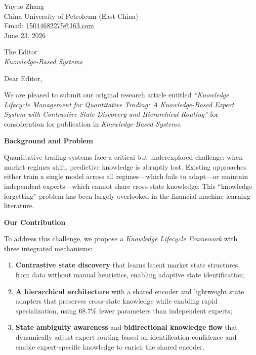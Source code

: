 \documentclass[11pt]{article}
\begin{document}
\begin{flushright}
Yuyue Zhang\\
China University of Petroleum (East China)\\
Email: \href{mailto:15044682275@163.com}{15044682275@163.com}\\
June 23, 2026
\end{flushright}

\begin{flushleft}
The Editor\\
\textit{Knowledge-Based Systems}
\end{flushleft}

\vspace{1em}

Dear Editor,

\vspace{1em}

We are pleased to submit our original research article entitled \textit{“Knowledge Lifecycle Management for Quantitative Trading: A Knowledge-Based Expert System with Contrastive State Discovery and Hierarchical Routing”} for consideration for publication in \textit{Knowledge-Based Systems}.

\vspace{1em}

\textbf{Background and Problem}

Quantitative trading systems face a critical but underexplored challenge: when market regimes shift, predictive knowledge is abruptly lost. Existing approaches either train a single model across all regimes—which fails to adapt—or maintain independent experts—which cannot share cross-state knowledge. This “knowledge forgetting” problem has been largely overlooked in the financial machine learning literature.

\vspace{1em}

\textbf{Our Contribution}

To address this challenge, we propose a \textit{Knowledge Lifecycle Framework} with three integrated mechanisms:

\begin{enumerate}[leftmargin=*,nosep]
\item \textbf{Contrastive state discovery} that learns latent market state structures from data without manual heuristics, enabling adaptive state identification;
\item \textbf{A hierarchical architecture} with a shared encoder and lightweight state adapters that preserves cross-state knowledge while enabling rapid specialization, using 68.7\% fewer parameters than independent experts;
\item \textbf{State ambiguity awareness} and \textbf{bidirectional knowledge flow} that dynamically adjust expert routing based on identification confidence and enable expert-specific knowledge to enrich the shared encoder.
\end{enumerate}
\end{document}
